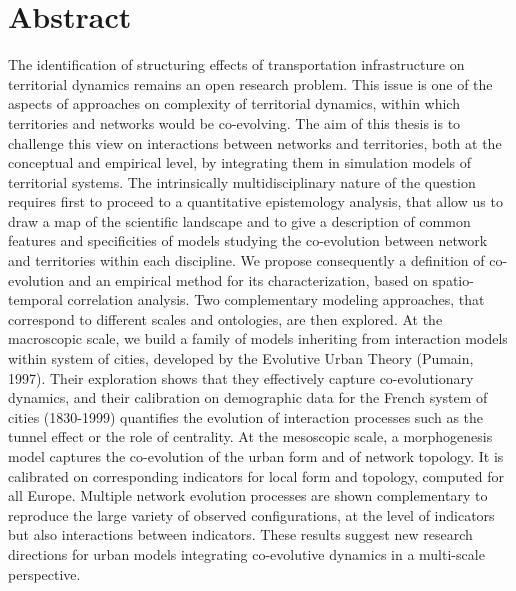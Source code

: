 \chapter*{Abstract}

The identification of structuring effects of transportation infrastructure on territorial dynamics remains an open research problem. This issue is one of the aspects of approaches on complexity of territorial dynamics, within which territories and networks would be co-evolving. The aim of this thesis is to challenge this view on interactions between networks and territories, both at the conceptual and empirical level, by integrating them in simulation models of territorial systems. The intrinsically multidisciplinary nature of the question requires first to proceed to a quantitative epistemology analysis, that allow us to draw a map of the scientific landscape and to give a description of common features and specificities of models studying the co-evolution between network and territories within each discipline. We propose consequently a definition of co-evolution and an empirical method for its characterization, based on spatio-temporal correlation analysis. Two complementary modeling approaches, that correspond to different scales and ontologies, are then explored. At the macroscopic scale, we build a family of models inheriting from interaction models within system of cities, developed by the Evolutive Urban Theory (Pumain, 1997). Their exploration shows that they effectively capture co-evolutionary dynamics, and their calibration on demographic data for the French system of cities (1830-1999) quantifies the evolution of interaction processes such as the tunnel effect or the role of centrality. At the mesoscopic scale, a morphogenesis model captures the co-evolution of the urban form and of network topology. It is calibrated on corresponding indicators for local form and topology, computed for all Europe. Multiple network evolution processes are shown complementary to reproduce the large variety of observed configurations, at the level of indicators but also interactions between indicators. These results suggest new research directions for urban models integrating co-evolutive dynamics in a multi-scale perspective.






\newpage


